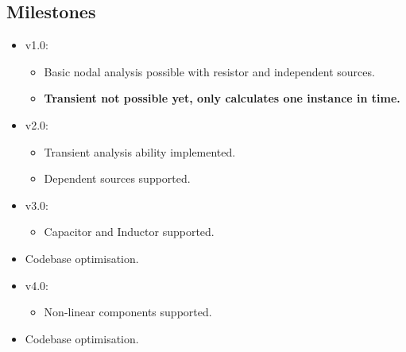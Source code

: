 \documentclass[a4paper, titlepage]{article}
\begin{document}
    \subsection{Milestones}
    \begin{itemize}
        \item v1.0: 
        \begin{itemize}
            \item Basic nodal analysis possible with resistor and independent sources.
            \item \textbf{Transient not possible yet, only calculates one instance in time.}
        \end{itemize}  
        \item v2.0: 
        \begin{itemize}
            \item Transient analysis ability implemented.
            \item Dependent sources supported.
        \end{itemize}
        \item v3.0:
        \begin{itemize}
            \item Capacitor and Inductor supported.
        \end{itemize}
        \item Codebase optimisation.
        \item v4.0:
        \begin{itemize}
            \item Non-linear components supported.
        \end{itemize}
        \item Codebase optimisation.
    \end{itemize}
\end{document}
